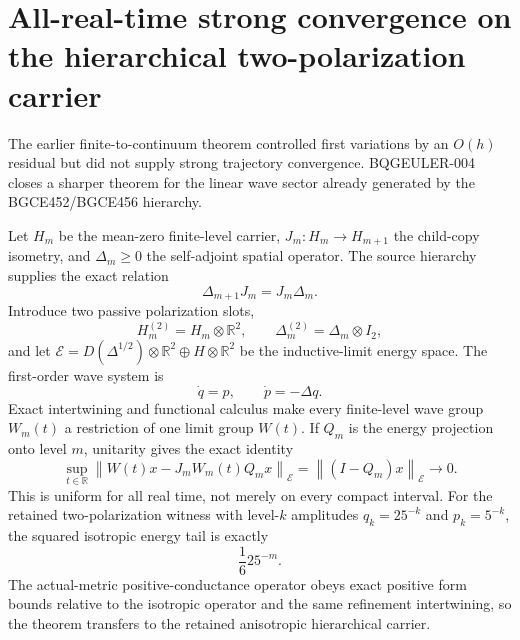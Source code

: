 \documentclass[11pt]{article}
\theoremstyle{definition}
\theoremstyle{remark}
\begin{document}
\section{All-real-time strong convergence on the hierarchical two-polarization carrier}\label{sec:euler092}

The earlier finite-to-continuum theorem controlled first variations by an $O(h)$ residual but did not supply strong trajectory convergence. BQGEULER-004 closes a sharper theorem for the linear wave sector already generated by the BGCE452/BGCE456 hierarchy.

Let $H_m$ be the mean-zero finite-level carrier, $J_m:H_m\to H_{m+1}$ the child-copy isometry, and $\Delta_m\ge0$ the self-adjoint spatial operator. The source hierarchy supplies the exact relation
\begin{equation}
 \Delta_{m+1}J_m=J_m\Delta_m.
 \label{eq:refinementwave092}
\end{equation}
Introduce two passive polarization slots,
\begin{equation}
 H_m^{(2)}=H_m\otimes\mathbb R^2,
 \qquad
 \Delta_m^{(2)}=\Delta_m\otimes I_2,
\end{equation}
and let $\mathcal E=D(\Delta^{1/2})\otimes\mathbb R^2\oplus H\otimes\mathbb R^2$ be the inductive-limit energy space. The first-order wave system is
\begin{equation}
 \dot q=p,
 \qquad
 \dot p=-\Delta q.
\end{equation}
Exact intertwining and functional calculus make every finite-level wave group $W_m(t)$ a restriction of one limit group $W(t)$. If $Q_m$ is the energy projection onto level $m$, unitarity gives the exact identity
\begin{equation}
 \sup_{t\in\mathbb R}
 \left\lVert W(t)x-J_mW_m(t)Q_mx\right\rVert_{\mathcal E}
 =\left\lVert(I-Q_m)x\right\rVert_{\mathcal E}
 \longrightarrow0.
 \label{eq:alltime092}
\end{equation}
This is uniform for all real time, not merely on every compact interval. For the retained two-polarization witness with level-$k$ amplitudes $q_k=25^{-k}$ and $p_k=5^{-k}$, the squared isotropic energy tail is exactly
\begin{equation}
 \frac{1}{6}25^{-m}.
\end{equation}
The actual-metric positive-conductance operator obeys exact positive form bounds relative to the isotropic operator and the same refinement intertwining, so the theorem transfers to the retained anisotropic hierarchical carrier.
\end{document}
